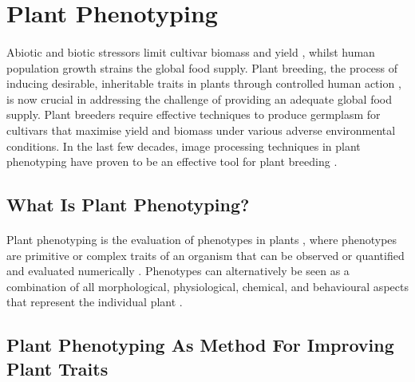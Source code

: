 \section{Plant Phenotyping}

\paragraph{}
Abiotic and biotic stressors limit cultivar biomass and yield \cite{grimeEvidenceExistenceThree1997}, whilst human population growth strains the global food supply. Plant breeding, the process of inducing desirable, inheritable traits in plants through controlled human action \cite{ortonIntroduction2020}, is now crucial in addressing the challenge of providing an adequate global food supply. Plant breeders require effective techniques to produce germplasm for cultivars that maximise yield and biomass under various adverse environmental conditions. In the last few decades, image processing techniques in plant phenotyping have proven to be an effective tool for plant breeding \cite{anandBreedingTechniquesDispense2023}.

\subsection{What Is Plant Phenotyping?}

\paragraph{}
Plant phenotyping is the evaluation of phenotypes in plants \cite{fioraniFutureScenariosPlant2013}, where phenotypes are primitive or complex traits of an organism that can be observed or quantified and evaluated numerically \cite{johannsenGenotypeConceptionHeredity1911a}.  Phenotypes can alternatively be seen as a combination of all morphological, physiological, chemical, and behavioural aspects that represent the individual plant \cite{guoPhenotypingPlants2014, mohammedReviewPlantPhenotyping2025, liReviewImagingTechniques2014}. 

\subsection{Plant Phenotyping As Method For Improving Plant Traits}

